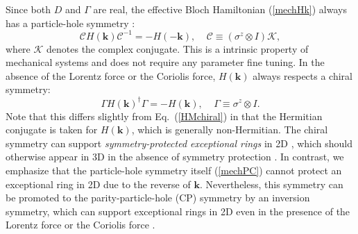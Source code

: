 \documentclass{tADP2e}
\theoremstyle{plain}
\theoremstyle{plain}
\theoremstyle{definition}
\begin{document}
Since both $D$ and $\Gamma$ are real, the effective Bloch Hamiltonian (\ref{mechHk}) always has a particle-hole symmetry \cite{SR16,YT19}: 
\begin{equation}
\mathcal{C}H(\boldsymbol{k})\mathcal{C}^{-1}=-H(-\boldsymbol{k}),\;\;\;\;\mathcal{C}\equiv(\sigma^z\otimes I)\mathcal{K},
\label{mechPC}
\end{equation}
where $\mathcal{K}$ denotes the complex conjugate. This is a intrinsic property of mechanical systems and does not require any parameter fine tuning. In the absence of the Lorentz force or the Coriolis force, $H(\boldsymbol{k})$ always respects a chiral symmetry:
\begin{equation}
 \Gamma H(\boldsymbol{k})^\dag \Gamma = -H(\boldsymbol{k}),\;\;\;\;\Gamma\equiv\sigma^z\otimes I.
\end{equation}
Note that this differs slightly from Eq.~(\ref{HMchiral}) in that the Hermitian conjugate is taken for $H(\boldsymbol{k})$, which is generally non-Hermitian. The chiral symmetry can support \emph{symmetry-protected exceptional rings} in 2D \cite{YT19}, which should otherwise appear in 3D in the absence of symmetry protection \cite{XY17,CA18}. In contrast, we emphasize that the particle-hole symmetry itself (\ref{mechPC}) cannot protect an exceptional ring in 2D due to the reverse of $\boldsymbol{k}$. Nevertheless, this symmetry can be promoted to the parity-particle-hole (CP) symmetry by an inversion symmetry, which can support exceptional rings in 2D even in the presence of the Lorentz force or the Coriolis force \cite{YT19}.
 
\end{document}
